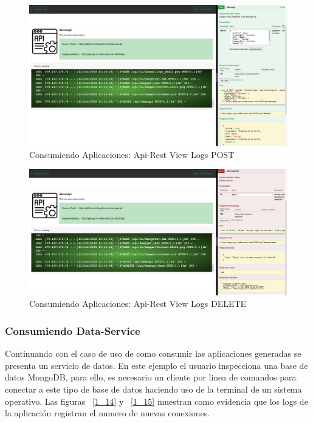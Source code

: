 \documentclass[a4paper,11pt]{book}
\begin{document}
~\\
~\\
~\\
~\\
\begin{figure}[H]
\centering
\includegraphics[scale=0.25]{imagenes/casouso_a/1_9.png}
\caption{ Consumiendo Aplicaciones: Api-Rest View Logs POST}
\label{1_9}
\end{figure}

\begin{figure}[H]
\centering
\includegraphics[scale=0.25]{imagenes/casouso_a/1_10.png}
\caption{ Consumiendo Aplicaciones: Api-Rest View Logs DELETE }
\label{1_10}
\end{figure}

\subsubsection{Consumiendo Data-Service}

Continuando con el caso de uso de como consumir las aplicaciones generadas se presenta un servicio de datos. En este ejemplo el usuario inspecciona una base de datos MongoDB, para ello, es necesario un cliente por linea de comandos para conectar a este tipo de base de datos haciendo uso de la terminal de un sistema operativo. Las figuras ~\ref{1_14} y ~\ref{1_15} muestran como evidencia que los logs de la aplicación registran el numero de nuevas conexiones. 
~\\
~\\
~\\
~\\
~\\
~\\
\end{document}
